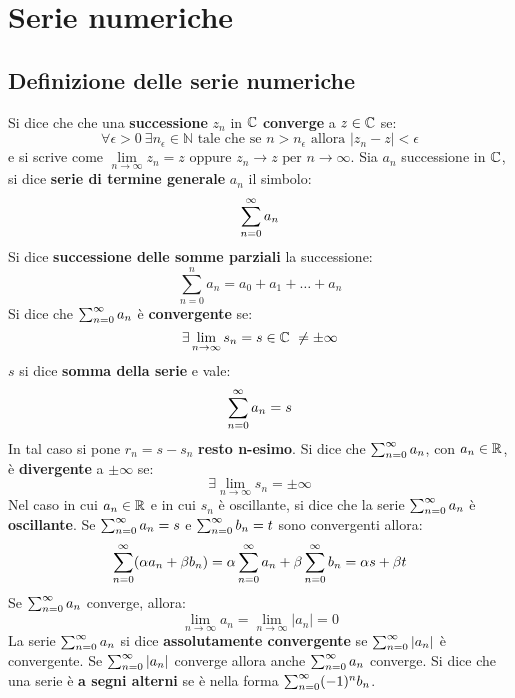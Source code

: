 \chapter{Serie numeriche}
\section{Definizione delle serie numeriche}
Si dice che che una \textbf{successione} $z_n$ in $\mathbb{C}$ \textbf{converge} a $z \in \mathbb{C}$ se:
$$\forall \epsilon >0\  \exists n_\epsilon \in \mathbb{N} \text{ tale che se } n>n_\epsilon \text{ allora } |z_n-z|<\epsilon$$
e si scrive come $\lim\limits_{n\rightarrow \infty}z_n = z$ oppure $z_n\rightarrow z \text{ per } n \rightarrow \infty$.
Sia $a_n$ successione in $\mathbb{C}$, si dice \textbf{serie di termine generale} $a_n$ il simbolo:
$$\sum_{n=0}^{\infty}a_n$$
Si dice \textbf{successione delle somme parziali} la successione:
$$\sum_{n=0}^{n}a_n=a_0+a_1+\dots+a_n$$
Si dice che $\sum_{n=0}^{\infty}a_n$ è \textbf{convergente} se:
$$\exists \lim\limits_{n \rightarrow \infty} s_n = s \in \mathbb{C} \ \ne \pm \infty$$
$s$ si dice \textbf{somma della serie} e vale:
$$\sum_{n=0}^{\infty}a_n = s$$
In tal caso si pone $r_n=s-s_n$ \textbf{resto n-esimo}.
Si dice che $\sum_{n=0}^{\infty}a_n$, con $a_n \in \mathbb{R}$, è \textbf{divergente} a $\pm \infty$ se:
$$\exists \lim\limits_{n \rightarrow \infty} s_n =  \pm \infty$$
Nel caso in cui $a_n \in \mathbb{R}$ e in cui $s_n$ è oscillante, si dice che la serie $\sum_{n=0}^{\infty}a_n$ è \textbf{oscillante}.
\prop
Se $\sum_{n=0}^{\infty}a_n = s$ e $\sum_{n=0}^{\infty} b_n = t$ sono convergenti allora:
$$\sum_{n=0}^{\infty}(\alpha a_n + \beta b_n)=\alpha \sum_{n=0}^{\infty}a_n + \beta \sum_{n=0}^{\infty} b_n=\alpha s + \beta t $$
Se $\sum_{n=0}^{\infty}a_n$ converge, allora:
$$\lim\limits_{n \rightarrow \infty} a_n = \lim\limits_{n \rightarrow \infty} |a_n| = 0$$
La serie $\sum_{n=0}^{\infty}a_n$ si dice \textbf{assolutamente convergente} se $\sum_{n=0}^{\infty}|a_n|$ è convergente.
\thh
Se $\sum_{n=0}^{\infty}|a_n|$ converge allora anche $\sum_{n=0}^{\infty}a_n$ converge.
Si dice che una serie è \textbf{a segni alterni} se è nella forma $\sum_{n=0}^{\infty} (-1)^n b_n$.

